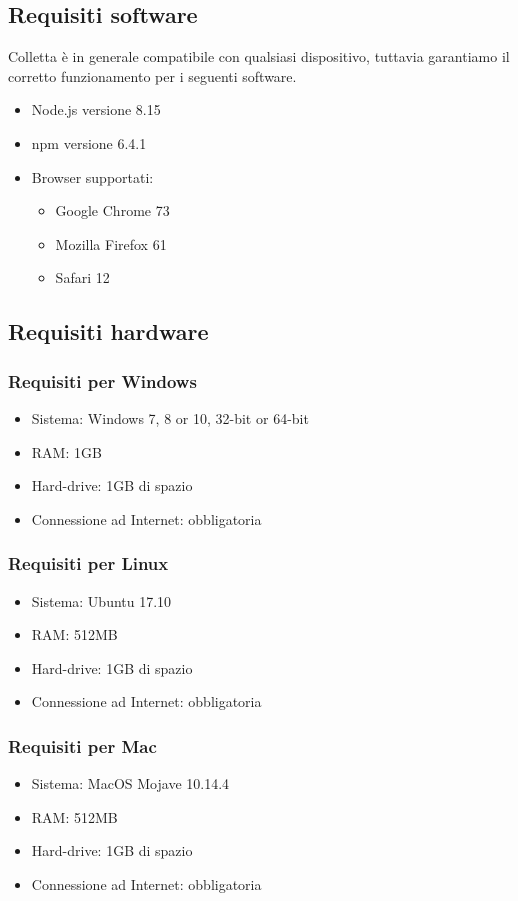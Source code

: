 \subsection{Requisiti software}
Colletta è in generale compatibile con qualsiasi dispositivo, tuttavia garantiamo il corretto funzionamento per i seguenti software.
\begin{itemize}
	\item Node.js versione 8.15
	\item npm versione 6.4.1
	\item Browser supportati:
	\begin{itemize}
		\item Google Chrome 73
		\item Mozilla Firefox 61
		\item Safari 12
	\end{itemize}
\end{itemize}
\subsection{Requisiti hardware}
\subsubsection{Requisiti per Windows}
\begin{itemize}
	\item Sistema: Windows 7, 8 or 10, 32-bit or 64-bit
	\item RAM: 1GB
	\item Hard-drive: 1GB di spazio
	\item Connessione ad Internet: obbligatoria
\end{itemize}
\subsubsection{Requisiti per Linux}
\begin{itemize}
	\item Sistema: Ubuntu 17.10
	\item RAM: 512MB
	\item Hard-drive: 1GB di spazio
	\item Connessione ad Internet: obbligatoria
\end{itemize}
\subsubsection{Requisiti per Mac}
\begin{itemize}
	\item Sistema: MacOS Mojave 10.14.4
	\item RAM: 512MB
	\item Hard-drive: 1GB di spazio
	\item Connessione ad Internet: obbligatoria
\end{itemize}
